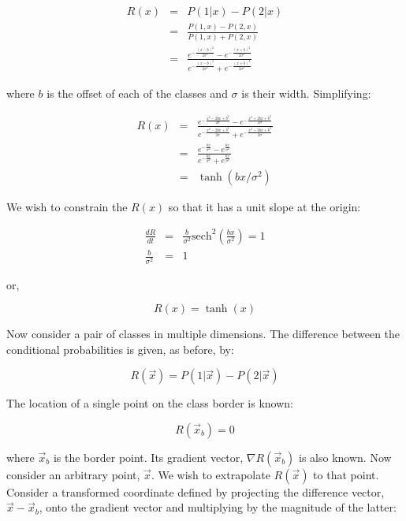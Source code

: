 \documentclass[12pt]{report}
\begin{document}
\begin{flushleft}
\begin{eqnarray}
R(x) & = & P(1 | x) - P(2 | x) \\
 & = & \frac{P(1, x) - P(2, x)}{P(1, x) + P(2, x)} \\
 & = & \frac{e^{-\frac{(x-b)^2}{2\sigma^2}} - e^{-\frac{(x+b)^2}{2\sigma^2}}}
 		{e^{-\frac{(x-b)^2}{2\sigma^2}} + e^{-\frac{(x+b)^2}{2\sigma^2}}}
\end{eqnarray}
 
 where $b$ is the offset of each of the classes and $\sigma$ is their width.
 Simplifying:
 
\begin{eqnarray}
R(x) & = & \frac{e^{-\frac{x^2 - 2bx + b^2}{2\sigma}} - e^{-\frac{x^2 + 2bx + b^2}{2\sigma}}}
		{e^{-\frac{x^2 - 2bx + b^2}{2\sigma}} + e^{-\frac{x^2 + 2bx + b^2}{2\sigma}}} \\
& = & \frac{e^{-\frac{bx}{\sigma^2}} - e^{\frac{bx}{\sigma^2}}}
		{e^{-\frac{bx}{\sigma^2}} + e^{\frac{bx}{\sigma^2}}} \\
& = & \tanh(bx/\sigma^2)
\end{eqnarray}

We wish to constrain the $R(x)$ so that it has a unit slope at the origin:

\begin{eqnarray}
\frac{dR}{dt} & = & \frac{b}{\sigma^2} \mathrm{sech}^2 \left (\frac{bx}{\sigma^2} \right ) = 1 \\
\frac{b}{\sigma^2} & = & 1
\end{eqnarray}

or,

\begin{equation}
R(x) = \tanh(x)
\label{cext:r1sim}
\end{equation}

Now consider a pair of classes in multiple dimensions.  The difference between
the conditional probabilities is given, as before, by:

\begin{equation}
R(\vec x) = P(1 | \vec x) - P(2 | \vec x)
\end{equation}
  
  The location
of a single point on the class border is known:

\begin{equation}
R(\vec x_b)=0
\end{equation}

where $\vec x_b$ is the border point.  Its gradient vector, $\nabla R(\vec x_b)$
is also known.  Now consider an arbitrary point, $\vec x$.  We wish to extrapolate
$R(\vec x)$ to that point.  Consider a transformed coordinate defined by 
projecting the difference vector, $\vec x - \vec x_b$, onto the gradient vector
and multiplying by the magnitude of the latter:


\end{flushleft}
\end{document}
